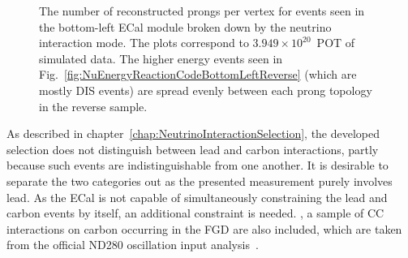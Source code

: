 \begin{figure}%
  \centering
  \caption{The number of reconstructed prongs per vertex for events seen in the bottom-left ECal module broken down by the neutrino interaction mode. The plots correspond to $3.949\times 10^{20}$~POT of simulated data.  The higher energy events seen in Fig.~\ref{fig:NuEnergyReactionCodeBottomLeftReverse} (which are mostly DIS events) are spread evenly between each prong topology in the reverse sample.}
  \label{fig:NProngsReactionCodeBottomLeft}
\end{figure}
\newline
\newline
As described in chapter~\ref{chap:NeutrinoInteractionSelection}, the developed selection does not distinguish between lead and carbon interactions, partly because such events are indistinguishable from one another.  It is desirable to separate the two categories out as the presented measurement purely involves lead.  As the ECal is not capable of simultaneously constraining the lead and carbon events by itself, an additional constraint is needed.  , a sample of CC interactions on carbon occurring in the FGD are also included, which are taken from the official ND280 oscillation input analysis~\cite{CCIncSelFGDTN}.
